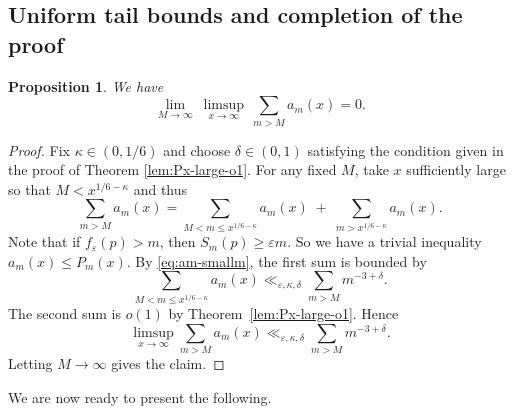 \documentclass[11pt,letterpaper,reqno]{amsart}
\newtheorem{proposition}[theorem]{Proposition}
\theoremstyle{definition}
\numberwithin{equation}{section}
\newcommand{\eps}{\varepsilon}
\newcommand{\1}{\mathbf{1}}
\begin{document}
\subsection{Uniform tail bounds and completion of the proof}









\begin{proposition}\label{prop:UI}
We have
\[
\lim_{M\to\infty}\ \limsup_{x\to\infty}\ \sum_{m>M} a_m(x)=0.
\]
\end{proposition}

\begin{proof}
Fix $\kappa\in(0,1/6)$ and choose $\delta\in(0,1)$ satisfying the condition given in the proof of Theorem \ref{lem:Px-large-o1}. For any fixed $M$, take $x$ sufficiently large so that
$M<x^{1/6-\kappa}$ and thus
\[
\sum_{m>M} a_m(x)=\sum_{M<m\le x^{1/6-\kappa}} a_m(x)\;+\;\sum_{m>x^{1/6-\kappa}} a_m(x).
\]
Note that if $f_\eps(p)>m$, then $S_m(p)\ge \eps m$. So we have a trivial inequality $a_m(x)\leq P_m(x)$. By \eqref{eq:am-smallm}, the first sum is bounded by
\[
\sum_{M<m\le x^{1/6-\kappa}} a_m(x)\ll_{\eps,\kappa,\delta}\sum_{m>M} m^{-3+\delta}.
\]
The second sum is $o(1)$ by Theorem~\ref{lem:Px-large-o1}. Hence
\[
\limsup_{x\to\infty}\sum_{m>M} a_m(x)\ll_{\eps,\kappa,\delta}\sum_{m>M} m^{-3+\delta}.
\]
Letting $M\to\infty$ gives the claim.
\end{proof}

We are now ready to present the following.
\end{document}
